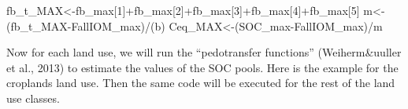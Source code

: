 \documentclass[
  10pt,
  b5paper,
]{book}
\newenvironment{Shaded}{\begin{snugshade}}{\end{snugshade}}
\newcommand{\DecValTok}[1]{\textcolor[rgb]{0.00,0.00,0.81}{#1}}
\newcommand{\NormalTok}[1]{#1}
\newcommand{\OtherTok}[1]{\textcolor[rgb]{0.56,0.35,0.01}{#1}}
\newcommand{\SpecialCharTok}[1]{\textcolor[rgb]{0.00,0.00,0.00}{#1}}
\begin{document}
\begin{Shaded}
\begin{Highlighting}[]
\NormalTok{fb\_t\_MAX}\OtherTok{\textless{}{-}}\NormalTok{fb\_max[}\DecValTok{1}\NormalTok{]}\SpecialCharTok{+}\NormalTok{fb\_max[}\DecValTok{2}\NormalTok{]}\SpecialCharTok{+}\NormalTok{fb\_max[}\DecValTok{3}\NormalTok{]}\SpecialCharTok{+}\NormalTok{fb\_max[}\DecValTok{4}\NormalTok{]}\SpecialCharTok{+}\NormalTok{fb\_max[}\DecValTok{5}\NormalTok{]}
\NormalTok{m}\OtherTok{\textless{}{-}}\NormalTok{(fb\_t\_MAX}\SpecialCharTok{{-}}\NormalTok{FallIOM\_max)}\SpecialCharTok{/}\NormalTok{(b)}
\NormalTok{Ceq\_MAX}\OtherTok{\textless{}{-}}\NormalTok{(SOC\_max}\SpecialCharTok{{-}}\NormalTok{FallIOM\_max)}\SpecialCharTok{/}\NormalTok{m }
\end{Highlighting}
\end{Shaded}

Now for each land use, we will run the ``pedotransfer functions'' (Weiherm\&uuller et al., 2013) to estimate the values of the SOC pools. Here is the example for the croplands land use. Then the same code will be executed for the rest of the land use classes.
\end{document}
